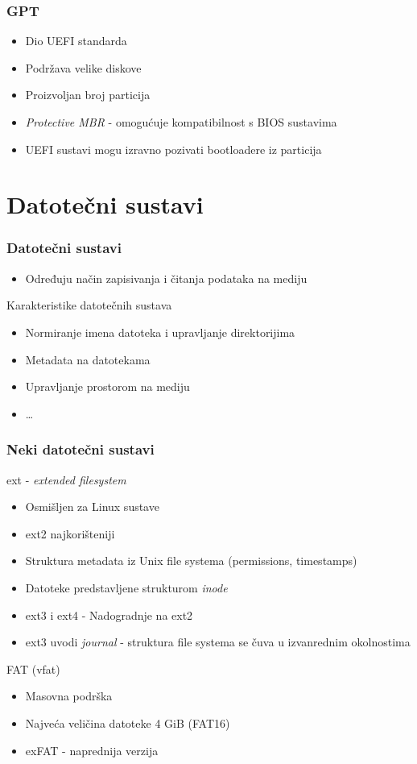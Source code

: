 \documentclass[t]{beamer}
\begin{document}
\begin{frame}
	\frametitle{GPT}
	\begin{itemize}
		\item Dio UEFI standarda
		\item Podržava velike diskove 
		\item Proizvoljan broj particija
	\end{itemize}
	\begin{itemize}
		\item \emph{Protective MBR} - omogućuje kompatibilnost s BIOS sustavima
		\item UEFI sustavi mogu izravno pozivati bootloadere iz particija
	\end{itemize}
\end{frame}

\section{Datotečni sustavi}
\begin{frame}
	\frametitle{Datotečni sustavi}
	\begin{itemize}
		\item Određuju način zapisivanja i čitanja podataka na mediju
	\end{itemize}
	Karakteristike datotečnih sustava
	\begin{itemize}
		\item Normiranje imena datoteka i upravljanje direktorijima
		\item Metadata na datotekama
		\item Upravljanje prostorom na mediju
		\item \dots
	\end{itemize}
\end{frame}

\begin{frame}
	\frametitle{Neki datotečni sustavi}
	ext - \emph{extended filesystem}
	\begin{itemize}
		\item Osmišljen za Linux sustave
		\item ext2 najkorišteniji
		\item Struktura metadata iz Unix file systema (permissions, timestamps)
		\item Datoteke predstavljene strukturom \emph{inode}
		\item ext3 i ext4 - Nadogradnje na ext2
		\item ext3 uvodi \emph{journal} - struktura file systema se čuva u izvanrednim okolnostima
	\end{itemize}
	FAT (vfat)\
	\begin{itemize}
		\item Masovna podrška
		\item Najveća veličina datoteke 4 GiB (FAT16)
		\item exFAT - naprednija verzija
	\end{itemize}
\end{frame}
\end{document}
